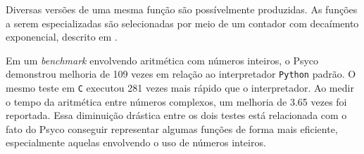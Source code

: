 Diversas versões de uma mesma função são possívelmente produzidas.
As funções a serem especializadas são selecionadas por meio de um
contador com decaímento exponencial, descrito em \cite{holzle}.

Em um \textit{benchmark} envolvendo aritmética com números inteiros, o
Psyco demonstrou melhoria de 109 vezes em relação ao interpretador
\texttt{Python} padrão. O mesmo teste em \texttt{C} executou 281 vezes
mais rápido que o interpretador. Ao medir o tempo da aritmética entre
números complexos, um melhoria de 3.65 vezes foi reportada. Essa
diminuição drástica entre os dois testes está relacionada com o fato
do Psyco conseguir representar algumas funções de forma mais
eficiente, especialmente aquelas envolvendo o uso de números inteiros.








